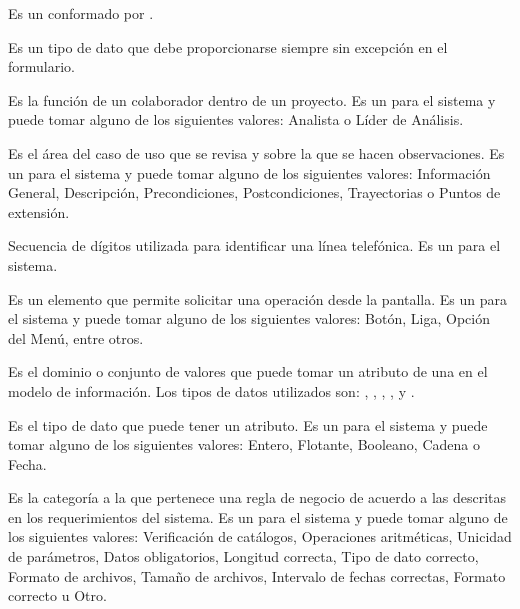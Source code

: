 \begin{description}
	 Es un   conformado por .

	 Es un tipo de dato que debe proporcionarse siempre sin excepción en el formulario.
	
	 Es la función de un colaborador dentro de un proyecto. Es un  para el sistema y puede tomar alguno de los siguientes valores:
	Analista o Líder de Análisis.
	
	 Es el área del caso de uso que se revisa y sobre la que se hacen observaciones. Es un  para el sistema y puede tomar alguno de los siguientes valores:
	Información General, Descripción, Precondiciones, Postcondiciones, Trayectorias o Puntos de extensión.
	
	 Secuencia de dígitos utilizada para identificar una línea telefónica. Es un  para el sistema.
	
	 Es un elemento que permite solicitar una operación desde la pantalla. Es un  para el sistema y puede tomar alguno de los siguientes valores:
	Botón, Liga, Opción del Menú, entre otros.
	
	 Es el dominio o conjunto de valores que puede tomar un atributo de una  en el modelo de información. Los tipos de datos 
	utilizados son: , , , ,  y 
	.
	
	 Es el tipo de dato que puede tener un atributo. Es un  para el sistema y puede tomar alguno de los siguientes valores:
	Entero, Flotante, Booleano, Cadena o Fecha.
	
	 Es la categoría a la que pertenece una regla de negocio de acuerdo a las descritas en los requerimientos del sistema.
	Es un  para el sistema y puede tomar alguno de los siguientes valores:
	Verificación de catálogos, Operaciones aritméticas, Unicidad de parámetros, Datos obligatorios, Longitud correcta, Tipo de dato correcto, Formato de archivos, 
	Tamaño de archivos, Intervalo de fechas correctas, Formato correcto u Otro.
	
\end{description}
